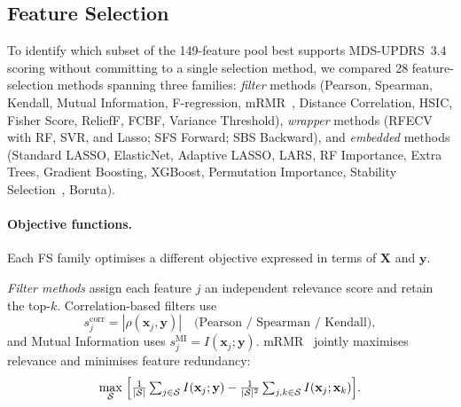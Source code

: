 \documentclass[conference]{IEEEtran}
\begin{document}
\subsection{Feature Selection}\label{sec:fs}

To identify which subset of the 149-feature pool best supports MDS-UPDRS~3.4 scoring
without committing to a single selection method, we compared 28 feature-selection
methods spanning three families: \emph{filter} methods (Pearson, Spearman, Kendall,
Mutual Information, F-regression, mRMR~\cite{Peng2005}, Distance Correlation, HSIC,
Fisher Score, ReliefF, FCBF, Variance Threshold), \emph{wrapper}
methods (RFECV with RF, SVR, and Lasso; SFS Forward; SBS Backward), and
\emph{embedded} methods (Standard LASSO, ElasticNet, Adaptive LASSO, LARS,
RF Importance, Extra Trees, Gradient Boosting, XGBoost,
Permutation Importance, Stability Selection~\cite{Meinshausen2009}, Boruta).

\paragraph{Objective functions.}
Each FS family optimises a different objective expressed in terms of $\mathbf{X}$ and
$\mathbf{y}$.

\emph{Filter methods} assign each feature $j$ an independent relevance score and
retain the top-$k$.
Correlation-based filters use
\begin{equation}
    s_j^{\mathrm{corr}} = |\rho(\mathbf{x}_j,\mathbf{y})|
    \quad\text{(Pearson / Spearman / Kendall)},
    \label{eq:filter_corr}
\end{equation}
and Mutual Information uses $s_j^{\mathrm{MI}} = I(\mathbf{x}_j;\mathbf{y})$.
mRMR~\cite{Peng2005} jointly maximises relevance and minimises feature redundancy:
\begin{equation}
    \max_{\mathcal{S}}\;\Bigl[
        \tfrac{1}{|\mathcal{S}|}\textstyle\sum_{j\in\mathcal{S}} I(\mathbf{x}_j;\mathbf{y})
        -
        \tfrac{1}{|\mathcal{S}|^2}\textstyle\sum_{j,k\in\mathcal{S}} I(\mathbf{x}_j;\mathbf{x}_k)
    \Bigr].
    \label{eq:mrmr}
\end{equation}
\end{document}
